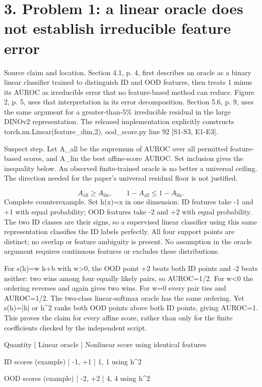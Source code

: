 \documentclass[10pt]{article}
\begin{document}
\section*{3. Problem 1: a linear oracle does not establish irreducible feature error}
Source claim and location. Section 4.1, p. 4, first describes an oracle as a binary linear classifier trained to distinguish ID and OOD features, then treats 1 minus its AUROC as irreducible error that no feature-based method can reduce. Figure 2, p. 5, uses that interpretation in its error decomposition. Section 5.6, p. 9, uses the same argument for a greater-than-5\% irreducible residual in the large DINOv2 representation. The released implementation explicitly constructs torch.nn.Linear(feature\_dim,2), ood\_score.py line 92 [S1-S3, E1-E3].\par
Suspect step. Let A\_all be the supremum of AUROC over all permitted feature-based scores, and A\_lin the best affine-score AUROC. Set inclusion gives the inequality below. An observed finite-trained oracle is no better a universal ceiling. The direction needed for the paper’s universal residual floor is not justified.\par
\[A_{\mathrm{all}}\ge A_{\mathrm{lin}},\qquad 1-A_{\mathrm{all}}\le 1-A_{\mathrm{lin}}.\] Complete counterexample. Set h(x)=x in one dimension. ID features take -1 and +1 with equal probability; OOD features take -2 and +2 with equal probability. The two ID classes are their signs, so a supervised linear classifier using this same representation classifies the ID labels perfectly. All four support points are distinct; no overlap or feature ambiguity is present. No assumption in the oracle argument requires continuous features or excludes these distributions.\par
For s(h)=w h+b with w>0, the OOD point +2 beats both ID points and -2 beats neither: two wins among four equally likely pairs, so AUROC=1/2. For w<0 the ordering reverses and again gives two wins. For w=0 every pair ties and AUROC=1/2. The two-class linear-softmax oracle has the same ordering. Yet s(h)=|h| or h\textasciicircum{}2 ranks both OOD points above both ID points, giving AUROC=1. This proves the claim for every affine score, rather than only for the finite coefficients checked by the independent script.\par
Quantity | Linear oracle | Nonlinear score using identical features\par
ID scores (example) | -1, +1 | 1, 1 using h\textasciicircum{}2\par
OOD scores (example) | -2, +2 | 4, 4 using h\textasciicircum{}2\par
\end{document}
